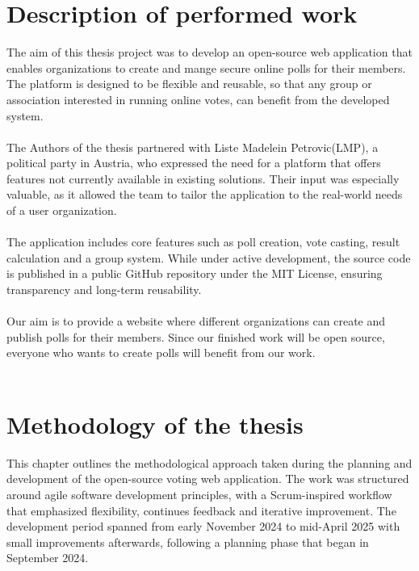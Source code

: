 \documentclass[a4paper,12pt]{report}
\begin{document}
\section{Description of performed work}
The aim of this thesis project was to develop an open-source web application that enables organizations to create and mange secure online polls for their members. The platform is designed to be flexible and reusable, so that any group or association interested in running online votes, can benefit from the developed system.\\\\
The Authors of the thesis partnered with Liste Madelein Petrovic(LMP), a political party in Austria, who expressed the need for a platform that offers features not currently available in existing solutions. Their input was especially valuable, as it allowed the team to tailor the application to the real-world needs of a user organization.\\\\
The application includes core features such as poll creation, vote casting, result calculation and a group system. While under active development, the source code is published in a public GitHub repository under the MIT License, ensuring transparency and long-term reusability. \parencite{opensourceinit}\\\\
Our aim is to provide a website where different organizations can create and publish polls for their members. Since our finished work will be open source, everyone who wants to create polls will benefit from our work. \\ \\

\section{Methodology of the thesis}
This chapter outlines the methodological approach taken during the planning and development of the open-source voting web application. The work was structured around agile software development principles, with a Scrum-inspired workflow that emphasized flexibility, continues feedback and iterative improvement. The development period spanned from early November 2024 to mid-April 2025 with small improvements afterwards, following a planning phase that began in September 2024. \\
\end{document}
